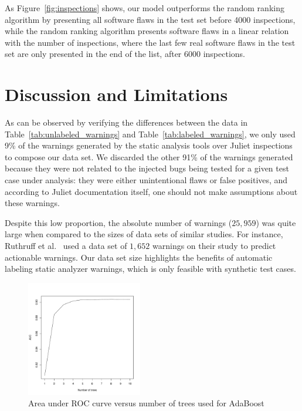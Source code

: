 As Figure~\ref{fig:inspections} shows, our model outperforms the random ranking
algorithm by presenting all software flaws in the test set before 4000
inspections, while the random ranking algorithm presents software flaws in a
linear relation with the number of inspections, where the last few real
software flaws in the test set are only presented in the end of the list, after
6000 inspections.


\section{Discussion and Limitations}
\label{sec:discussion}

As can be observed by verifying the differences between the data in
Table~\ref{tab:unlabeled_warnings} and Table~\ref{tab:labeled_warnings}, we
only used 9\% of the warnings generated by the static analysis tools over
Juliet inspections to compose our data set. We discarded the other 91\% of the
warnings generated because they were not related to the injected bugs being
tested for a given test case under analysis: they were either unintentional
flaws or false positives, and according to Juliet documentation itself, one
should not make assumptions about these warnings.

Despite this low proportion, the absolute number of warnings ($25,959$) was quite large
when compared to the sizes of data sets of similar studies. For instance, Ruthruff et
al.~\cite{ruthruff_predicting_2008} used a data set of $1,652$ warnings on
their study to predict actionable warnings. Our data set size highlights the
benefits of automatic labeling static analyzer warnings, which is only feasible
with synthetic test cases.

\begin{figure}
\centering
\includegraphics[width=0.45\textwidth]{figures/roc.pdf}
  \caption{Area under ROC curve versus number of trees used for AdaBoost}\label{fig:roc}
\end{figure}


